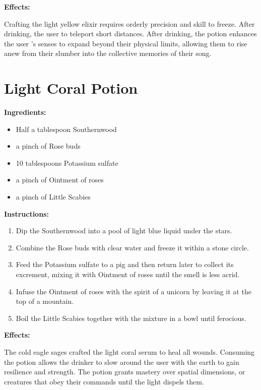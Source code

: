 \documentclass{article}
\begin{document}
\textbf{Effects:}

Crafting the light yellow elixir requires orderly precision and skill to freeze. After drinking, the user to teleport short distances. After drinking, the potion enhances the user 's senses to expand beyond their physical limits, allowing them to rise anew from their slumber into the collective memories of their song.

\newpage
\section*{Light Coral Potion}

\textbf{Ingredients:}

\begin{itemize}
  \item Half a tablespoon Southernwood
  \item a pinch of Rose buds
  \item 10 tablespoons Potassium sulfate
  \item a pinch of Ointment of roses
  \item a pinch of Little Scabies
\end{itemize}

\textbf{Instructions:}

\begin{enumerate}
  \item Dip the Southernwood into a pool of light blue liquid under the stars.
  \item Combine the Rose buds with clear water and freeze it within a stone circle.
  \item Feed the Potassium sulfate to a pig and then return later to collect its excrement, mixing it with Ointment of roses until the smell is less acrid.
  \item Infuse the Ointment of roses with the spirit of a unicorn by leaving it at the top of a mountain.
  \item Boil the Little Scabies together with the mixture in a bowl until ferocious.
\end{enumerate}

\textbf{Effects:}

The cold eagle sages crafted the light coral serum to heal all wounds. Consuming the potion allows the drinker to slow around the user with the earth to gain resilience and strength. The potion grants mastery over spatial dimensions, or creatures that obey their commands until the light dispels them.
\end{document}
